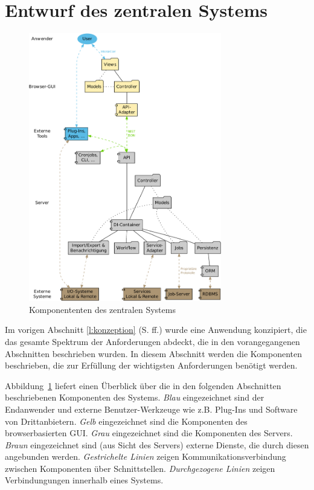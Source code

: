 \section{Entwurf des zentralen Systems}\label{l:entwurf}

\begin{figure}[htb]
\begin{center}
\includegraphics[width=0.75\textwidth]{media/komponenten.pdf}
\end{center}
\caption{Komponententen des zentralen Systems}
\label{chart:komponenten}
\end{figure}

Im vorigen Abschnitt \ref{l:konzeption} (S.\pageref{l:konzeption} ff.) wurde eine Anwendung konzipiert, die das gesamte Spektrum der Anforderungen abdeckt, die in den vorangegangenen Abschnitten beschrieben wurden. In diesem Abschnitt werden die Komponenten beschrieben, die zur Erfüllung der wichtigsten Anforderungen benötigt werden. 

Abbildung~\ref{chart:komponenten} liefert einen Überblick über die in den folgenden Abschnitten beschriebenen Komponenten des Systems. \emph{Blau} eingezeichnet sind der Endanwender und externe Benutzer-Werkzeuge wie z.B. Plug-Ins und Software von Drittanbietern. \emph{Gelb} eingezeichnet sind die Komponenten des browserbasierten GUI. \emph{Grau} eingezeichnet sind die Komponenten des Servers. \emph{Braun} eingezeichnet sind (aus Sicht des Servers) externe Dienste, die durch diesen angebunden werden. \emph{Gestrichelte Linien} zeigen Kommunikationsverbindung zwischen Komponenten über Schnittstellen. \emph{Durchgezogene Linien} zeigen Verbindungungen innerhalb eines Systems. 

